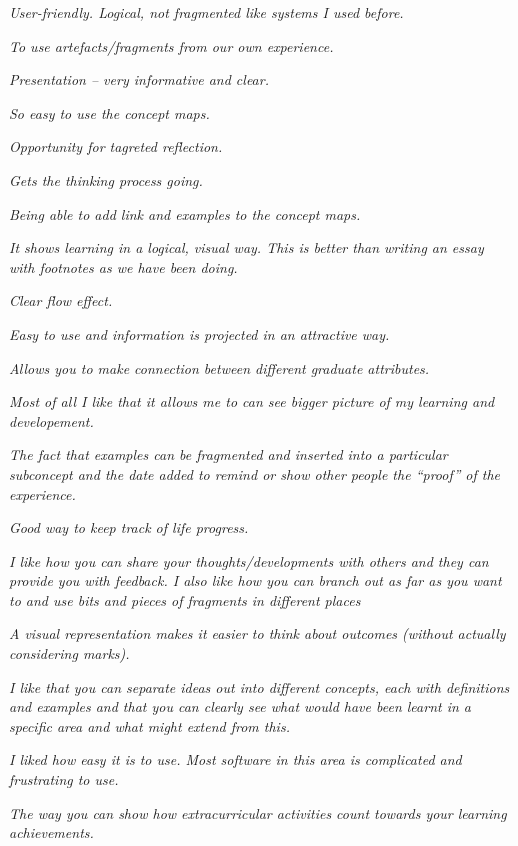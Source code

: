 \textit{User-friendly. Logical, not fragmented like systems I used before.}

\textit{To use artefacts/fragments from our own experience.}

\textit{Presentation -- very informative and clear.}

\textit{So easy to use the concept maps.}

\textit{Opportunity for tagreted reflection.}

\textit{Gets the thinking process going.}

\textit{Being able to add link and examples to the concept maps.}

\textit{It shows learning in a logical, visual way. This is better than writing
an essay with footnotes as we have been doing.}

\textit{Clear flow effect.}

\textit{Easy to use and information is projected in an attractive way.}

\textit{Allows you to make connection between different graduate attributes.}

\textit{Most of all I like that it allows me to can see bigger picture of
my learning and developement.}

\textit{The fact that examples can be fragmented and inserted into a particular
subconcept and the date added to remind or show other people the ``proof'' of the
experience.}

\textit{Good way to keep track of life progress.}

\textit{I like how you can share your thoughts/developments with others and they
can provide you with feedback. I also like how you can branch out as far as you
want to and use bits and pieces of fragments in different places}

\textit{A visual representation makes it easier to think about outcomes (without
actually considering marks).}

\textit{I like that you can separate ideas out into different concepts, each
with definitions and examples and that you can clearly see what would have been
learnt in a specific area and what might extend from this.}

\textit{I liked how easy it is to use. Most software in this area is complicated
and frustrating to use.}

\textit{The way you can show how extracurricular activities count towards your
learning achievements.}


